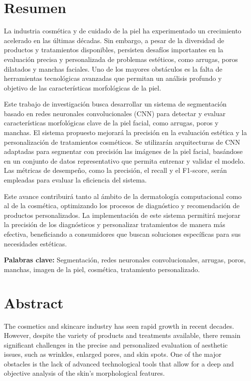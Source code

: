 \thispagestyle{plain}

\chapter*{Resumen}

La industria cosmética y de cuidado de la piel ha experimentado un crecimiento acelerado en las últimas décadas. Sin embargo, a pesar de la diversidad de productos y tratamientos disponibles, persisten desafíos importantes en la evaluación precisa y personalizada de problemas estéticos, como arrugas, poros dilatados y manchas faciales. Uno de los mayores obstáculos es la falta de herramientas tecnológicas avanzadas que permitan un análisis profundo y objetivo de las características morfológicas de la piel.

Este trabajo de investigación busca desarrollar un sistema de segmentación basado en redes neuronales convolucionales (CNN) para detectar y evaluar características morfológicas clave de la piel facial, como arrugas, poros y manchas. El sistema propuesto mejorará la precisión en la evaluación estética y la personalización de tratamientos cosméticos. Se utilizarán arquitecturas de CNN adaptadas para segmentar con precisión las imágenes de la piel facial, basándose en un conjunto de datos representativo que permita entrenar y validar el modelo. Las métricas de desempeño, como la precisión, el recall y el F1-score, serán empleadas para evaluar la eficiencia del sistema.

Este avance contribuirá tanto al ámbito de la dermatología computacional como al de la cosmética, optimizando los procesos de diagnóstico y recomendación de productos personalizados. La implementación de este sistema permitirá mejorar la precisión de los diagnósticos y personalizar tratamientos de manera más efectiva, beneficiando a consumidores que buscan soluciones específicas para sus necesidades estéticas.

\textbf{Palabras clave:} Segmentación, redes neuronales convolucionales, arrugas, poros, manchas, imagen de la piel, cosmética, tratamiento personalizado.

\clearpage
\chapter*{Abstract}

The cosmetics and skincare industry has seen rapid growth in recent decades. However, despite the variety of products and treatments available, there remain significant challenges in the precise and personalized evaluation of aesthetic issues, such as wrinkles, enlarged pores, and skin spots. One of the major obstacles is the lack of advanced technological tools that allow for a deep and objective analysis of the skin's morphological features.

